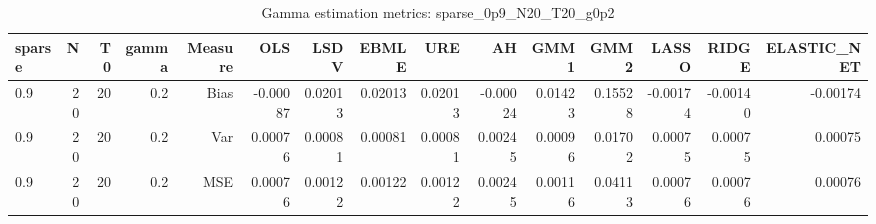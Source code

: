 \begin{table}[!htbp]\centering
\caption{Gamma estimation metrics: sparse_0p9_N20_T20_g0p2}
\label{tab:table1_sparse_0p9_N20_T20_g0p2}
\begin{tabular}{lrrrrrrrrrrrrrr}
\hline
sparse & N & T0 & gamma & Measure & OLS & LSDV & EBMLE & URE & AH & GMM1 & GMM2 & LASSO & RIDGE & ELASTIC_NET \\
\hline
0.9 & 20 & 20 & 0.2 & Bias & -0.00087 & 0.02013 & 0.02013 & 0.02013 & -0.00024 & 0.01423 & 0.15528 & -0.00174 & -0.00140 & -0.00174 \\
0.9 & 20 & 20 & 0.2 & Var & 0.00076 & 0.00081 & 0.00081 & 0.00081 & 0.00245 & 0.00096 & 0.01702 & 0.00075 & 0.00075 & 0.00075 \\
0.9 & 20 & 20 & 0.2 & MSE & 0.00076 & 0.00122 & 0.00122 & 0.00122 & 0.00245 & 0.00116 & 0.04113 & 0.00076 & 0.00076 & 0.00076 \\
\hline
\end{tabular}
\end{table}

